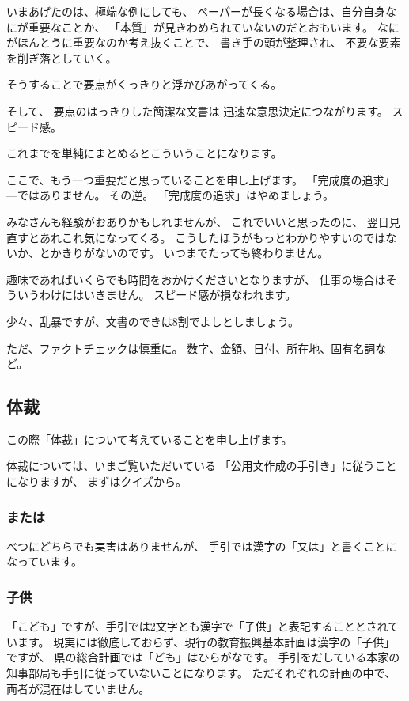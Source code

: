 \documentclass[uplatex,jis2004,dvipdfmx,12pt]{jsarticle}
\begin{document}
いまあげたのは、極端な例にしても、
ペーパーが長くなる場合は、自分自身なにが重要なことか、
「本質」が見きわめられていないのだとおもいます。
なにがほんとうに重要なのか考え抜くことで、
書き手の頭が整理され、
不要な要素を削ぎ落としていく。

そうすることで要点がくっきりと浮かびあがってくる。

そして、
要点のはっきりした簡潔な文書は
迅速な意思決定につながります。
スピード感。

これまでを単純にまとめるとこういうことになります。

ここで、もう一つ重要だと思っていることを申し上げます。
「完成度の追求」---ではありません。
その逆。
「完成度の追求」はやめましょう。

みなさんも経験がおありかもしれませんが、
これでいいと思ったのに、
翌日見直すとあれこれ気になってくる。
こうしたほうがもっとわかりやすいのではないか、とかきりがないのです。
いつまでたっても終わりません。

趣味であればいくらでも時間をおかけくださいとなりますが、
仕事の場合はそういうわけにはいきません。
スピード感が損なわれます。

少々、乱暴ですが、文書のできは8割でよしとしましょう。


ただ、ファクトチェックは慎重に。
数字、金額、日付、所在地、固有名詞など。




\subsection{体裁}

この際「体裁」について考えていることを申し上げます。


体裁については、いまご覧いただいている
「公用文作成の手引き」に従うことになりますが、
まずはクイズから。

\subsubsection{または}
べつにどちらでも実害はありませんが、
手引では漢字の「又は」と書くことになっています。


\subsubsection{子供}
「こども」ですが、手引では2文字とも漢字で「子供」と表記することとされています。
現実には徹底しておらず、現行の教育振興基本計画は漢字の「子供」ですが、
県の総合計画では「ども」はひらがなです。
手引をだしている本家の知事部局も手引に従っていないことになります。
ただそれぞれの計画の中で、
両者が混在はしていません。
\end{document}
